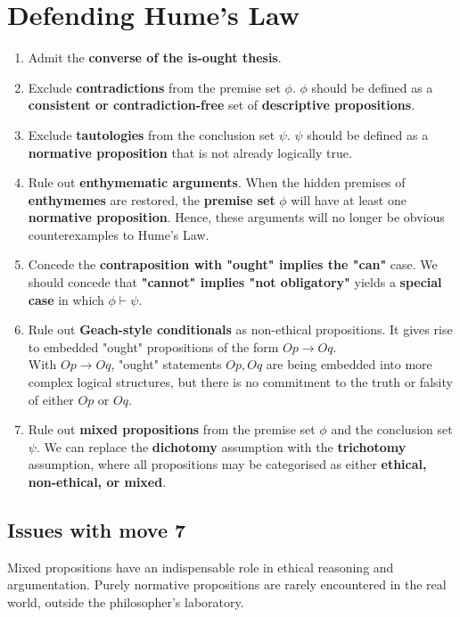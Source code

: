 \documentclass[11pt]{article}
\begin{document}
\section{Defending Hume's Law}
\label{sec:org8450538}
\begin{enumerate}
\item Admit the \textbf{converse of the is-ought thesis}.
\item Exclude \textbf{contradictions} from the premise set \(\phi\). \(\phi\) should be defined as a \textbf{consistent or contradiction-free} set of \textbf{descriptive propositions}.
\item Exclude \textbf{tautologies} from the conclusion set \(\psi\). \(\psi\) should be defined as a \textbf{normative proposition} that is not already logically true.
\item Rule out \textbf{enthymematic arguments}. When the hidden premises of \textbf{enthymemes} are restored, the \textbf{premise set} \(\phi\) will have at least one \textbf{normative proposition}. Hence, these arguments will no longer be obvious counterexamples to Hume's Law.
\item Concede the \textbf{contraposition with "ought" implies the "can"} case. We should concede that \textbf{"cannot" implies "not obligatory"} yields a \textbf{special case} in which \(\phi \vdash \psi\).
\item Rule out \textbf{Geach-style conditionals} as non-ethical propositions. It gives rise to embedded "ought" propositions of the form \(Op \rightarrow Oq\).  \\

With \(Op \rightarrow Oq\), "ought" statements \(Op, Oq\) are being embedded into more complex logical structures, but there is no commitment to the truth or falsity of either \(Op\) or \(Oq\).
\item Rule out \textbf{mixed propositions} from the premise set \(\phi\) and the conclusion set \(\psi\). We can replace the \textbf{dichotomy} assumption with the \textbf{trichotomy} assumption, where all propositions may be categorised as either \textbf{ethical, non-ethical, or mixed}.
\end{enumerate}

 \newpage
\subsection{Issues with move 7}
\label{sec:org8133ae7}
Mixed propositions have an indispensable role in ethical reasoning and argumentation. Purely normative propositions are rarely encountered in the real world, outside the philosopher's laboratory.  \\
\end{document}
